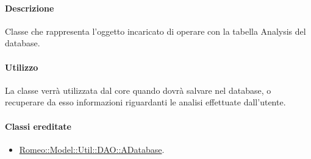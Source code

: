 \paragraph{Descrizione \\}
Classe che rappresenta l'oggetto incaricato di operare con la tabella Analysis del database.
\paragraph{Utilizzo\\}
La classe verrà utilizzata dal core quando dovrà salvare nel database, o recuperare da esso informazioni riguardanti le analisi effettuate dall'utente.
\paragraph{Classi ereditate\\}
	\begin{itemize}
	\item \hyperref[speadatabase]{Romeo::Model::Util::DAO::ADatabase}.
	\end{itemize}
	
